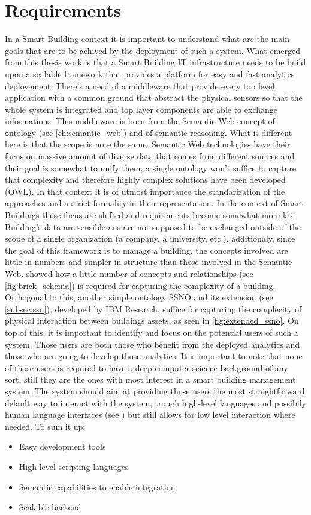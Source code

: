\section{Requirements}
In a Smart Building context it is important to understand what are the main goals that are to be achived by the deployment of such a system. What emerged from this thesis work is that a Smart Building IT infrastructure needs to be build upon a scalable framework that provides a platform for easy and fast analytics deployement. There's a need of a middleware that provide every top level application with a common ground that abstract the physical sensors so that the whole system is integrated and top layer components are able to exchange informations. %
This middleware is born from the Semantic Web concept of ontology (see \autoref{ch:semantic_web}) and of semantic reasoning. What is different here is that the scope is note the same. Semantic Web technologies have their focus on massive amount of diverse data that comes from different sources and their goal is somewhat to unify them, a single ontology won't suffice to capture that complexity and therefore highly complex solutions have been developed (OWL). In that context it is of utmost importance the standarization of the approaches and a strict formality in their representation. In the context of Smart Buildings these focus are shifted and requirements become somewhat more lax. Building's data are sensible ans are not supposed to be exchanged outside of the scope of a single organization (a company, a university, etc.), additionaly, since the goal of this framework is to manage a building, the concepts involved are little in numbers and simpler in structure than those involved in the Semantic Web. \textcite{brick_schema} showed how a little number of concepts and relationships (see \autoref{fig:brick_schema}) is required for capturing the complexity of a building. Orthogonal to this, another simple ontology SSNO and its extension (see \autoref{subsec:ssn}), developed by IBM Research, suffice for capturing the complecity of physical interaction between buildings assets, as seen in \autoref{fig:extended_ssno}.
On top of this, it is important to identify and focus on the potential users of such a system. Those users are both those who benefit from the deployed analytics and those who are going to develop those analytics. It is important to note that none of those users is required to have a deep computer science background of any sort, still they are the ones with most interest in a smart building management system. The system should aim at providing those users the most straightforward default way to interact with the system, trough high-level languages and possibily human language interfaces (see ) but still allows for low level interaction where needed. To sum it up:
\begin{itemize}
  \item Easy development tools
  \item High level scripting languages
  \item Semantic capabilities to enable integration
  \item Scalable backend
\end{itemize}

